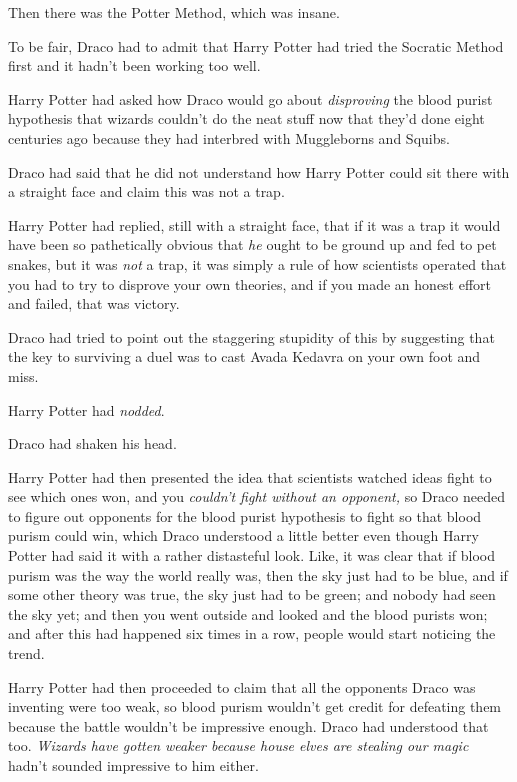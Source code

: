 Then there was the Potter Method, which was insane.

To be fair, Draco had to admit that Harry Potter had tried the Socratic Method first and it hadn't been working too well.

Harry Potter had asked how Draco would go about \emph{disproving} the blood purist hypothesis that wizards couldn't do the neat stuff now that they'd done eight centuries ago because they had interbred with Muggleborns and Squibs.

Draco had said that he did not understand how Harry Potter could sit there with a straight face and claim this was not a trap.

Harry Potter had replied, still with a straight face, that if it was a trap it would have been so pathetically obvious that \emph{he} ought to be ground up and fed to pet snakes, but it was \emph{not} a trap, it was simply a rule of how scientists operated that you had to try to disprove your own theories, and if you made an honest effort and failed, that was victory.

Draco had tried to point out the staggering stupidity of this by suggesting that the key to surviving a duel was to cast Avada Kedavra on your own foot and miss.

Harry Potter had \emph{nodded}.

Draco had shaken his head.

Harry Potter had then presented the idea that scientists watched ideas fight to see which ones won, and you \emph{couldn't fight without an opponent,} so Draco needed to figure out opponents for the blood purist hypothesis to fight so that blood purism could win, which Draco understood a little better even though Harry Potter had said it with a rather distasteful look. Like, it was clear that if blood purism was the way the world really was, then the sky just had to be blue, and if some other theory was true, the sky just had to be green; and nobody had seen the sky yet; and then you went outside and looked and the blood purists won; and after this had happened six times in a row, people would start noticing the trend.

Harry Potter had then proceeded to claim that all the opponents Draco was inventing were too weak, so blood purism wouldn't get credit for defeating them because the battle wouldn't be impressive enough. Draco had understood that too. \emph{Wizards have gotten weaker because house elves are stealing our magic} hadn't sounded impressive to him either.

